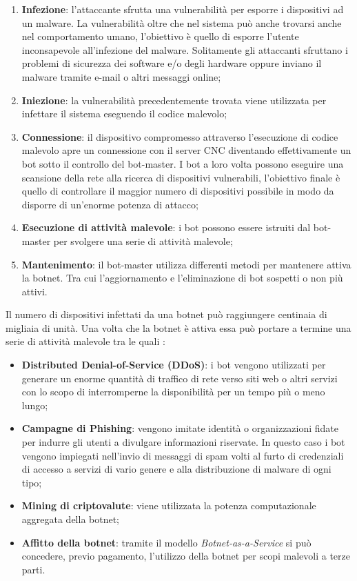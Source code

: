 \begin{enumerate}
    \item \textbf{Infezione}: l'attaccante sfrutta una vulnerabilità per esporre i dispositivi ad un malware. La vulnerabilità oltre che nel sistema può anche trovarsi anche nel comportamento umano, l'obiettivo è quello di esporre l'utente inconsapevole all'infezione del malware. Solitamente gli attaccanti sfruttano i problemi di sicurezza dei software e/o degli hardware oppure inviano il malware tramite e-mail o altri messaggi online;
    \item \textbf{Iniezione}: la vulnerabilità precedentemente trovata viene utilizzata per infettare il sistema eseguendo il codice malevolo; 
    \item \textbf{Connessione}: il dispositivo compromesso attraverso l'esecuzione di codice malevolo apre un connessione con il server CNC diventando effettivamente un bot sotto il controllo del bot-master. I bot a loro volta possono eseguire una scansione della rete alla ricerca di dispositivi vulnerabili, l'obiettivo finale è quello di controllare il maggior numero di dispositivi possibile in modo da disporre di un'enorme potenza di attacco;
    \item \textbf{Esecuzione di attività malevole}: i bot possono essere istruiti dal bot-master per svolgere una serie di attività malevole;
    \item \textbf{Mantenimento}: il bot-master utilizza differenti metodi per mantenere attiva la botnet. Tra cui l'aggiornamento e l'eliminazione di bot sospetti o non più attivi.
\end{enumerate}
Il numero di dispositivi infettati da una botnet può raggiungere centinaia di migliaia di unità. Una volta che la botnet è attiva essa può portare a termine una serie di attività malevole tra le quali \cite{attività_malevole}:
\begin{itemize}
    \item \textbf{Distributed Denial-of-Service (DDoS)}: i bot vengono utilizzati per generare un enorme quantità di traffico di rete verso siti web o altri servizi con lo scopo di interromperne la disponibilità per un tempo più o meno lungo;
    \item \textbf{Campagne di Phishing}: vengono imitate identità o organizzazioni fidate per indurre gli utenti a divulgare informazioni riservate. In questo caso i bot vengono impiegati nell'invio di messaggi di spam volti al furto di credenziali di accesso a servizi di vario genere e alla distribuzione di malware di ogni tipo;
    \item \textbf{Mining di criptovalute}: viene utilizzata la potenza computazionale aggregata della botnet;
    \item \textbf{Affitto della botnet}: tramite il modello \emph{Botnet-as-a-Service} si può concedere, previo pagamento, l'utilizzo della botnet per scopi malevoli a terze parti.
    
\end{itemize}
